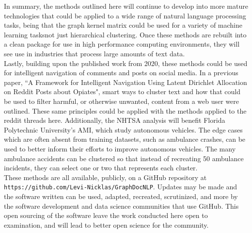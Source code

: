 In summary, the methods outlined here will continue to develop into more mature technologies that could be applied to a wide range of natural language processing tasks, being that the graph kernel matrix could be used for a variety of machine learning tasks\textemdash not just hierarchical clustering. Once these methods are rebuilt into a clean package for use in high performance computing environments, they will see use in industries that process large amounts of text data.\\
Lastly, building upon the published work from 2020, these methods could be used for intelligent navigation of comments and posts on social media. In a previous paper, ``A Framework for Intelligent Navigation Using Latent Dirichlet Allocation on Reddit Posts about Opiates", smart ways to cluster text and how that could be used to filter harmful, or otherwise unwanted, content from a web user were outlined. These same principles could be applied with the methods applied to the reddit threads here. Additionally, the NHTSA analysis will benefit Florida Polytechnic University's AMI, which study autonomous vehicles. The edge cases which are often absent from training datasets, such as ambulance crashes, can be used to better inform their efforts to improve autonomous vehicles. The many ambulance accidents can be clustered so that instead of recreating 50 ambulance incidents, they can select one or two that represents each cluster. \\

These methods are all available, publicly, on a GitHub repository at \texttt{https://github.com/Levi-Nicklas/GraphDocNLP}. Updates may be made and the software written can be used, adapted, recreated, scrutinized, and more by the software development and data science communities that use GitHub. This open sourcing of the software leave the work conducted here open to examination, and will lead to better open science for the community.

\nocite{vishwanathan2010graph}
\nocite{kriege2020survey}
\nocite{nikolentzos2017shortest}
\nocite{kondor2002diffusion}
\nocite{vazirgiannis2018graphrep}
\nocite{cheng2006n}
\nocite{rosenfeld2020kernel}
\nocite{akioyamen2020framework}
\nocite{wickham2019welcome}
\nocite{sugiyama2018graphkernels}
\nocite{sugiyama2015halting}
\nocite{csardi2013package}
\nocite{csardi2006igraph}
\nocite{silge2016tidytext}
\nocite{rivera2015package}
\nocite{wickham2010stringr}
\nocite{bengtsson2020unifying}







